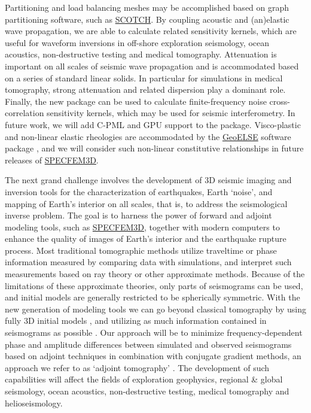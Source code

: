\documentclass[referee,extra]{gji}
\begin{document}
Partitioning and load balancing meshes may be accomplished based on graph partitioning software,
such as \href{http://www.labri.fr/perso/pelegrin/scotch/}{SCOTCH}.
By coupling acoustic and (an)elastic wave propagation,
we are able to calculate related sensitivity kernels,
which are useful for waveform inversions in off-shore exploration seismology,
ocean acoustics, non-destructive testing and medical tomography.
Attenuation is important on all scales of seismic wave propagation and is accommodated based on a series of standard linear solids.
In particular for  simulations in medical tomography, strong attenuation and related dispersion play a dominant role.
Finally, the new package can be used to calculate finite-frequency noise cross-correlation sensitivity kernels,
which may be used for seismic interferometry.
In future work, we will add C-PML and GPU support to the package.
Visco-plastic and non-linear elastic rheologies \citep[e.g.,][]{XuBiGhWa03,Priscoetal2007} are accommodated by the
\href{http://geoelse.stru.polimi.it/}{GeoELSE} software package  \citep{StPaIg09,ChMoTsBaKrKaStKr10},
and we will consider such non-linear constitutive relationships in future releases of
\href{http://www.geodynamics.org/cig/software/specfem3d}{SPECFEM3D}.

The next grand challenge involves the development of 3D seismic imaging and inversion tools for the characterization
of earthquakes, Earth `noise', and mapping of Earth's interior on all scales,
that is, to address the seismological inverse problem.
The goal is to harness the power of forward and adjoint modeling tools,
such as \href{http://www.geodynamics.org/cig/software/specfem3d}{SPECFEM3D},
together with modern computers to enhance
the quality of images of Earth's interior and the earthquake rupture process.
Most traditional tomographic methods utilize traveltime or phase information measured by comparing data with simulations,
and interpret such measurements based on ray theory or other approximate methods.
Because of the limitations of these approximate theories, only parts of seismograms can be used,
and initial models are generally restricted to be spherically symmetric.
With the new generation of modeling tools we can go beyond classical tomography
by using fully 3D initial models \citep[e.g.,][]{Akcelik02,Akcelik03,Askan07a,PChen07b,Fichtner09,Fi11},
and utilizing as much information contained in seismograms as possible \citep[e.g.,][]{Maggi2009,Valentine2010}.
Our approach will be to minimize frequency-dependent phase and amplitude
differences between simulated and observed seismograms based on adjoint techniques in combination with conjugate
gradient methods,
an approach we refer to as `adjoint tomography' \citep{TaLiMaTr09,TaLiMaTr2010}.
The development of such capabilities will affect the fields of exploration geophysics,
regional \& global seismology, ocean acoustics, non-destructive testing, medical tomography and helioseismology.
\end{document}
